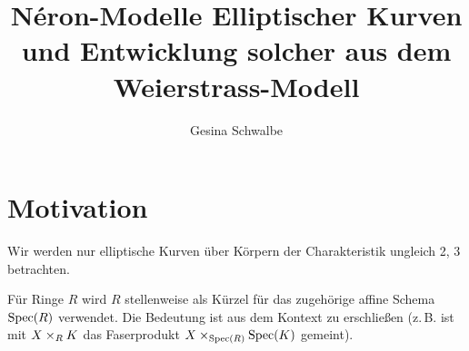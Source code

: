 \documentclass[german]{scrreprt}
\title{Néron-Modelle Elliptischer Kurven 
  und Entwicklung solcher aus dem Weierstrass-Modell}
\author{Gesina Schwalbe}
\begin{document}
\maketitle
\tableofcontents

\chapter{Motivation}
Wir werden nur elliptische Kurven über Körpern der Charakteristik
ungleich 2, 3 betrachten.

Für Ringe $R$ wird $R$ stellenweise als Kürzel für das zugehörige
affine Schema $\operatorname{Spec}(R)$ verwendet. Die Bedeutung ist aus dem Kontext
zu erschließen (z.\,B. ist mit $X\times_R K$ das Faserprodukt
$X\times_{\operatorname{Spec}(R)}\operatorname{Spec}(K)$ gemeint).

\end{document}
